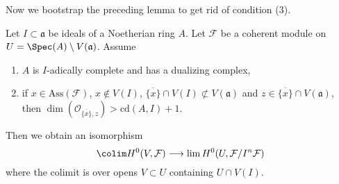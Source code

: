 \noindent
Now we bootstrap the preceding lemma to get rid of condition (3).

\begin{proposition}
\label{proposition-application-H0}
Let $I \subset \mathfrak a$ be ideals of a Noetherian ring $A$.
Let $\mathcal{F}$ be a coherent module on
$U = \Spec(A) \setminus V(\mathfrak a)$.
Assume
\begin{enumerate}
\item $A$ is $I$-adically complete and has a dualizing complex,
\item if $x \in \text{Ass}(\mathcal{F})$, $x \not \in V(I)$,
$\overline{\{x\}} \cap V(I) \not \subset V(\mathfrak a)$
and $z \in \overline{\{x\}} \cap V(\mathfrak a)$, then
$\dim(\mathcal{O}_{\overline{\{x\}}, z}) > \text{cd}(A, I) + 1$.
\end{enumerate}
Then we obtain an isomorphism
$$
\colim H^0(V, \mathcal{F})
\longrightarrow
\lim H^0(U, \mathcal{F}/I^n\mathcal{F})
$$
where the colimit is over opens $V \subset U$ containing $U \cap V(I)$.
\end{proposition}

